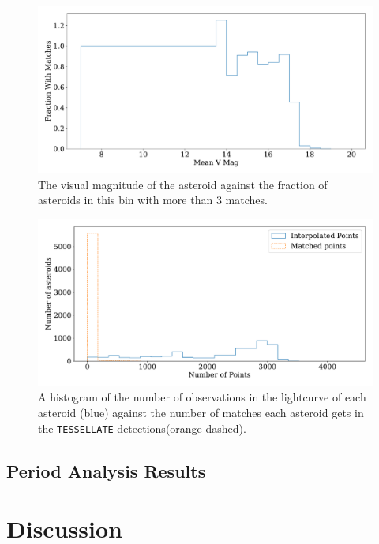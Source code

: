 \documentclass{UCreport}
\begin{document}
\begin{figure}
  \centering
  \includegraphics[width = \textwidth]{../OzData/matchesHist29.pdf}
  \caption[Magnitude of matches]{The visual magnitude of the asteroid against the fraction of asteroids in this bin with more than 3 %
    matches.
  }
  \label{Fig:MagofMatches}
\end{figure}


\begin{figure}
  \centering
  \includegraphics[width=\textwidth]{../OzData/pointsMatchesNumberHistTEST.pdf}
  \caption[Number of observations or matches]{A histogram of the number of observations in the lightcurve of each asteroid (blue) against the number of matches each asteroid gets in the \texttt{TESSELLATE} detections(orange dashed). }
  \label{Fig:MatchInterpHists}
\end{figure}

\subsection{Period Analysis Results}\label{SubSec:PerRes}

\section{Discussion}\label{Sec:Disc}
\end{document}
